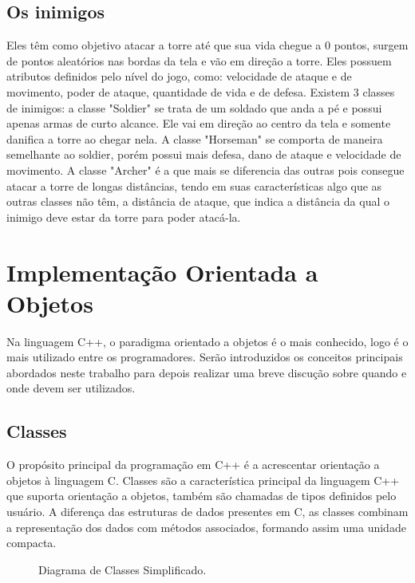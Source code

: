 \documentclass[rel_mlp]{iiufrgs}
\newcommand{\fonte}[1]{\\Fonte: {#1}}
\begin{document}
\section{Os inimigos}
Eles têm como objetivo atacar a torre até que sua vida chegue a 0 pontos, surgem de pontos aleatórios nas bordas da tela e vão em direção a torre. Eles possuem atributos definidos pelo nível do jogo, como: velocidade de ataque e de movimento, poder de ataque, quantidade de vida e de defesa.
	Existem 3 classes de inimigos: a classe "Soldier" se trata de um soldado que anda a pé e possui apenas armas de curto alcance. Ele vai em direção ao centro da tela e somente danifica a torre ao chegar nela.
	A classe "Horseman" se comporta de maneira semelhante ao soldier, porém possui mais defesa, dano de ataque e velocidade de movimento.
	A classe "Archer" é a que mais se diferencia das outras pois consegue atacar a torre de longas distâncias, tendo em suas características algo que as outras classes não têm, a distância de ataque, que indica a distância da qual o inimigo deve estar da torre para poder atacá-la. 

\chapter{ Implementação Orientada a Objetos} \label{Implementação OO}
Na linguagem C++, o paradigma orientado a objetos é o mais conhecido, logo é o mais utilizado entre os programadores.
Serão introduzidos os conceitos principais abordados neste trabalho para depois realizar uma breve discução sobre quando e onde devem ser utilizados.
\section{Classes}
O propósito principal da programação em C++ é a acrescentar orientação a objetos à linguagem C. Classes são a característica principal da linguagem C++ que suporta orientação a objetos, também são chamadas de tipos definidos pelo usuário. A diferença das estruturas de dados presentes em C, as classes combinam a representação dos dados com métodos associados, formando assim uma unidade compacta. 
\bigbreak

\begin{figure}[htb]
    \centering
    \label{fig:figura1}
    \caption{Diagrama de Classes Simplificado.}
\end{figure}
\end{document}
